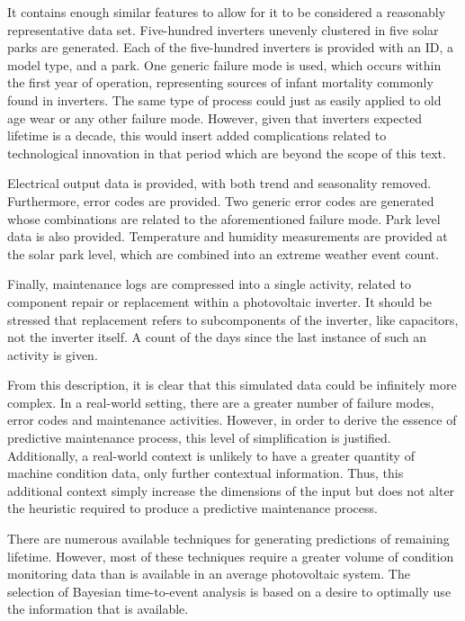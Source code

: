 It contains enough similar features to allow for it to be considered a reasonably representative data set. Five-hundred inverters unevenly clustered in five solar parks are generated. Each of the five-hundred inverters is provided with an ID, a model type, and a park. One generic failure mode is used, which occurs within the first year of operation, representing sources of infant mortality commonly found in inverters\cite{Dhere2005}. The same type of process could just as easily applied to old age wear or any other failure mode. However, given that inverters expected lifetime is a decade, this would insert added complications related to technological innovation in that period which are beyond the scope of this text.

Electrical output data is provided, with both trend and seasonality removed. Furthermore, error codes are provided. Two generic error codes are generated whose combinations are related to the aforementioned failure mode. Park level data is also provided. Temperature and humidity measurements are provided at the solar park level, which are combined into an extreme weather event count. 

Finally, maintenance logs are compressed into a single activity, related to component repair or replacement within a photovoltaic inverter. It should be stressed that replacement refers to subcomponents of the inverter, like capacitors, not the inverter itself. A count of the days since the last instance of such an activity is given.

From this description, it is clear that this simulated data could be infinitely more complex. In a real-world setting, there are a greater number of failure modes, error codes and maintenance activities. However, in order to derive the essence of predictive maintenance process, this level of simplification is justified. Additionally, a real-world context is unlikely to have a greater quantity of machine condition data, only further contextual information. Thus, this additional context simply increase the dimensions of the input but does not alter the heuristic required to produce a predictive maintenance process. 

There are numerous available techniques for generating predictions of remaining lifetime. However, most of these techniques require a greater volume of condition monitoring data than is available in an average photovoltaic system. The selection of Bayesian time-to-event analysis is based on a desire to optimally use the information that is available. 

